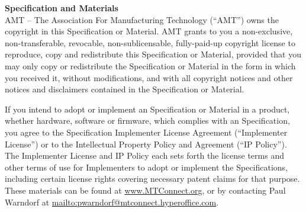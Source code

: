 \documentclass{mtconnect}	%
\begin{document}




\begin{nolinenumbers}
	\maketitle				%
\end{nolinenumbers}


\textbf{\color{mtc1}\Large \mtconnect Specification and Materials} \\

AMT -- The Association For Manufacturing Technology (``AMT'') owns the copyright in this \mtconnect Specification or Material. AMT grants to you a non-exclusive, non-transferable, revocable, non-sublicensable, fully-paid-up copyright license to reproduce, copy and redistribute this \mtconnect Specification or Material, provided that you may only copy or redistribute the \mtconnect Specification or Material in the form in which you received it, without modifications, and with all copyright notices and other notices and disclaimers contained in the \mtconnect Specification or Material.

If you intend to adopt or implement an \mtconnect Specification or Material in a product, whether hardware, software or firmware, which complies with an \mtconnect Specification, you \shall agree to the \mtconnect Specification Implementer License Agreement (``Implementer License'') or to the \mtconnect Intellectual Property Policy and Agreement (``IP Policy''). The Implementer License and IP Policy each sets forth the license terms and other terms of use for \mtconnect Implementers to adopt or implement the \mtconnect Specifications, including certain license rights covering necessary patent claims for that purpose. These materials can be found at \url{www.MTConnect.org}, or by contacting Paul Warndorf at \url{mailto:pwarndorf@mtconnect.hyperoffice.com}. 
\end{document}
